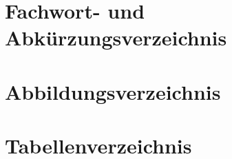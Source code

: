 \documentclass[12pt,a4paper,oneside,bibliography=totocnumbered]{scrartcl}
\author{\MyAuthor}
\title{\MyTitel}
\date{\MyDatum}
\let\abk\nomenclature
\begin{document}

\newpage
 
\renewcommand{\thesection}{\Roman{section}}  %

\thispagestyle{empty}


\newpage
\tableofcontents
\clearpage

\setcounter{section}{0}
\renewcommand{\thesection}{\arabic{section}} %








\newpage
 \section{Fachwort- und Abkürzungsverzeichnis}
\printnomenclature
\newpage

\section{Abbildungsverzeichnis}
\renewcommand{\listfigurename}{} 
\listoffigures
\newpage

\section{Tabellenverzeichnis}
\renewcommand{\listtablename}{} 
\listoftables
\newpage

\renewcommand\refname{Literatur- und Quellenverzeichnis}


\newpage

\thispagestyle{empty}


\lfoot{\LaTeX}
\end{document}
